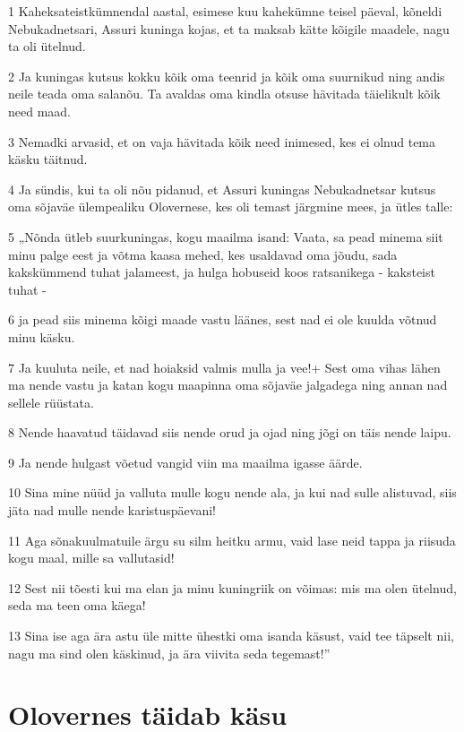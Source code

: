 \par 1 Kaheksateistkümnendal aastal, esimese kuu kahekümne teisel päeval, kõneldi Nebukadnetsari, Assuri kuninga kojas, et ta maksab kätte kõigile maadele, nagu ta oli ütelnud.
\par 2 Ja kuningas kutsus kokku kõik oma teenrid ja kõik oma suurnikud ning andis neile teada oma salanõu. Ta avaldas oma kindla otsuse hävitada täielikult kõik need maad.
\par 3 Nemadki arvasid, et on vaja hävitada kõik need inimesed, kes ei olnud tema käsku täitnud.
\par 4 Ja sündis, kui ta oli nõu pidanud, et Assuri kuningas Nebukadnetsar kutsus oma sõjaväe ülempealiku Olovernese, kes oli temast järgmine mees, ja ütles talle:
\par 5 „Nõnda ütleb suurkuningas, kogu maailma isand: Vaata, sa pead minema siit minu palge eest ja võtma kaasa mehed, kes usaldavad oma jõudu, sada kakskümmend tuhat jalameest, ja hulga hobuseid koos ratsanikega - kaksteist tuhat -
\par 6 ja pead siis minema kõigi maade vastu läänes, sest nad ei ole kuulda võtnud minu käsku.
\par 7 Ja kuuluta neile, et nad hoiaksid valmis mulla ja vee!+ Sest oma vihas lähen ma nende vastu ja katan kogu maapinna oma sõjaväe jalgadega ning annan nad sellele rüüstata.
\par 8 Nende haavatud täidavad siis nende orud ja ojad ning jõgi on täis nende laipu.
\par 9 Ja nende hulgast võetud vangid viin ma maailma igasse äärde.
\par 10 Sina mine nüüd ja valluta mulle kogu nende ala, ja kui nad sulle alistuvad, siis jäta nad mulle nende karistuspäevani!
\par 11 Aga sõnakuulmatuile ärgu su silm heitku armu, vaid lase neid tappa ja riisuda kogu maal, mille sa vallutasid!
\par 12 Sest nii tõesti kui ma elan ja minu kuningriik on võimas: mis ma olen ütelnud, seda ma teen oma käega!
\par 13 Sina ise aga ära astu üle mitte ühestki oma isanda käsust, vaid tee täpselt nii, nagu ma sind olen käskinud, ja ära viivita seda tegemast!”

\section*{Olovernes täidab käsu}

